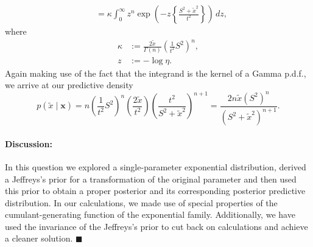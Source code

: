 \documentclass[a4paper,10pt, notitlepage]{report}
\begin{document}
{\begin{align*}
 &= \kappa \int_0^\infty z^n \exp\left(-z\left\{\frac{S^2 + \tilde{x}^2}{t^2}\right\}\right)\,dz,
\end{align*}
where
\begin{align*}
 \kappa &:= \frac{2\tilde{x}}{\Gamma(n)}\left(\frac{1}{t^2}S^2\right)^n,\\
 z &:=-\log\eta.
\end{align*}
Again making use of the fact that the integrand is the kernel of a Gamma p.d.f., we arrive at our predictive density
\begin{equation*}
 p(\tilde{x} \mid \boldsymbol{x}) = n \left(\frac{1}{t^2}S^2\right)^n \left(\frac{2\tilde{x}}{t^2}\right)\left(\frac{t^2}{S^2 + \tilde{x}^2}\right)^{n+1} = \frac{2n\tilde{x}\left(S^2\right)^n}{\left(S^2 + \tilde{x}^2\right)^{n+1}} .
\end{equation*}
\paragraph{Discussion:} In this question we explored a single-parameter exponential distribution, derived a Jeffreys's prior for a transformation of the original parameter and then used this prior to obtain a proper posterior and its corresponding posterior predictive distribution.
In our calculations, we made use of special properties of the cumulant-generating function of the exponential family.
Additionally, we have used the invariance of the Jeffreys's prior to cut back on calculations and achieve a cleaner solution.
$\blacksquare$
}


\end{document}
